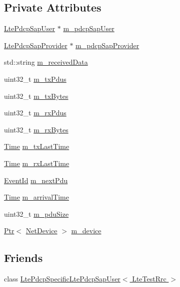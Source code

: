 \subsection*{Private Attributes}
\begin{DoxyCompactItemize}
\item 
\hyperlink{classns3_1_1LtePdcpSapUser}{Lte\+Pdcp\+Sap\+User} $\ast$ \hyperlink{classns3_1_1LteTestRrc_a30236886625d6d592ffd5418ce29ca97}{m\+\_\+pdcp\+Sap\+User}
\item 
\hyperlink{classns3_1_1LtePdcpSapProvider}{Lte\+Pdcp\+Sap\+Provider} $\ast$ \hyperlink{classns3_1_1LteTestRrc_adafcdc66d6ad60762ac4678c21adb5ef}{m\+\_\+pdcp\+Sap\+Provider}
\item 
std\+::string \hyperlink{classns3_1_1LteTestRrc_a69aacdfc9370a74754b5ade0f3a49c77}{m\+\_\+received\+Data}
\item 
uint32\+\_\+t \hyperlink{classns3_1_1LteTestRrc_a6ce0dee0deab77c0e0e1f0639d3b5804}{m\+\_\+tx\+Pdus}
\item 
uint32\+\_\+t \hyperlink{classns3_1_1LteTestRrc_a3dc28e3aafa754182994ee88852d4ee3}{m\+\_\+tx\+Bytes}
\item 
uint32\+\_\+t \hyperlink{classns3_1_1LteTestRrc_a1ad1724ee3f2c6ac80930e3c5c7f7d86}{m\+\_\+rx\+Pdus}
\item 
uint32\+\_\+t \hyperlink{classns3_1_1LteTestRrc_a3d4019f30e2bbd62cb19572b22882bec}{m\+\_\+rx\+Bytes}
\item 
\hyperlink{classns3_1_1Time}{Time} \hyperlink{classns3_1_1LteTestRrc_a55899e82de707f5b72fad6e982135c21}{m\+\_\+tx\+Last\+Time}
\item 
\hyperlink{classns3_1_1Time}{Time} \hyperlink{classns3_1_1LteTestRrc_a3ccf2a99aaff8a9eba7812a671b481b9}{m\+\_\+rx\+Last\+Time}
\item 
\hyperlink{classns3_1_1EventId}{Event\+Id} \hyperlink{classns3_1_1LteTestRrc_aa4344b96bac1a8d2be2085572f2a1f31}{m\+\_\+next\+Pdu}
\item 
\hyperlink{classns3_1_1Time}{Time} \hyperlink{classns3_1_1LteTestRrc_a2783c730c511a77254fd0586f6676bd2}{m\+\_\+arrival\+Time}
\item 
uint32\+\_\+t \hyperlink{classns3_1_1LteTestRrc_a1ec8995be8bf344bb7ef0203af271e27}{m\+\_\+pdu\+Size}
\item 
\hyperlink{classns3_1_1Ptr}{Ptr}$<$ \hyperlink{classns3_1_1NetDevice}{Net\+Device} $>$ \hyperlink{classns3_1_1LteTestRrc_ae398739c647e739e3d4915ee43be1f6e}{m\+\_\+device}
\end{DoxyCompactItemize}
\subsection*{Friends}
\begin{DoxyCompactItemize}
\item 
class \hyperlink{classns3_1_1LteTestRrc_a4a201218759006d4432c2c9d5caaed3a}{Lte\+Pdcp\+Specific\+Lte\+Pdcp\+Sap\+User$<$ Lte\+Test\+Rrc $>$}
\end{DoxyCompactItemize}
